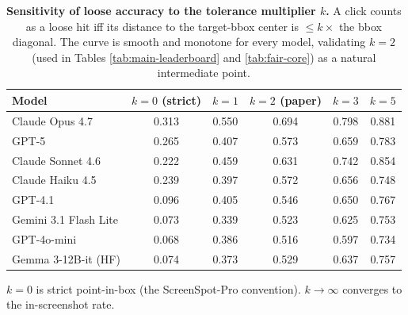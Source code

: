 \begin{table}[t]
\centering
\small
\begin{threeparttable}
\caption{\textbf{Sensitivity of loose accuracy to the tolerance multiplier $k$.}
A click counts as a loose hit iff its distance to the target-bbox center is
$\le k\times$ the bbox diagonal. The curve is smooth and monotone for every
model, validating $k{=}2$ (used in Tables \ref{tab:main-leaderboard} and
\ref{tab:fair-core}) as a natural intermediate point.}
\label{tab:loose-sensitivity}
\begin{tabular}{@{}lccccc@{}}
\toprule
\textbf{Model} & \textbf{$k{=}0$ (strict)} & \textbf{$k{=}1$} & \textbf{$k{=}2$ (paper)} & \textbf{$k{=}3$} & \textbf{$k{=}5$} \\
\midrule
Claude Opus 4.7         & 0.313 & 0.550 & 0.694 & 0.798 & 0.881 \\
GPT-5                   & 0.265 & 0.407 & 0.573 & 0.659 & 0.783 \\
Claude Sonnet 4.6       & 0.222 & 0.459 & 0.631 & 0.742 & 0.854 \\
Claude Haiku 4.5        & 0.239 & 0.397 & 0.572 & 0.656 & 0.748 \\
GPT-4.1                 & 0.096 & 0.405 & 0.546 & 0.650 & 0.767 \\
Gemini 3.1 Flash Lite   & 0.073 & 0.339 & 0.523 & 0.625 & 0.753 \\
GPT-4o-mini             & 0.068 & 0.386 & 0.516 & 0.597 & 0.734 \\
Gemma 3-12B-it (HF)     & 0.074 & 0.373 & 0.529 & 0.637 & 0.757 \\
\bottomrule
\end{tabular}
\begin{tablenotes}
\footnotesize
\item $k{=}0$ is strict point-in-box (the ScreenSpot-Pro convention).
$k{\to}\infty$ converges to the in-screenshot rate.
\end{tablenotes}
\end{threeparttable}
\end{table}


